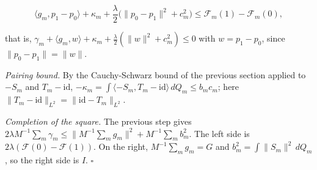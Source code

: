 \documentclass[11pt,a4paper]{report}
\begin{document}
\[\langle g_m,p_1-p_0\rangle+\kappa_m+\frac\lambda2\bigl(\|p_0-p_1\|^2+c_m^2\bigr)\le\mathcal F_m(1)-\mathcal F_m(0),\]


that is, \(\gamma_m+\langle g_m,w\rangle+\kappa_m+\frac\lambda2(\|w\|^2+c_m^2)\le0\) with \(w=p_1-p_0\), since \(\|p_0-p_1\|=\|w\|\).




\emph{Pairing bound.} By the Cauchy-Schwarz bound of the previous section applied to \(-S_m\) and \(T_m-\mathrm{id}\), \(-\kappa_m=\int\langle-S_m,T_m-\mathrm{id}\rangle\,dQ_m\le b_mc_m\); here \(\|T_m-\mathrm{id}\|_{L^2}=\|\mathrm{id}-T_m\|_{L^2}\).




\emph{Completion of the square.} The previous step gives \(2\lambda M^{-1}\sum_m\gamma_m\le\|M^{-1}\sum_mg_m\|^2+M^{-1}\sum_mb_m^2\). The left side is \(2\lambda(\mathcal F(0)-\mathcal F(1))\). On the right, \(M^{-1}\sum_mg_m=G\) and \(b_m^2=\int\|S_m\|^2\,dQ_m\), so the right side is \(I\). \(\square\)
\end{document}

